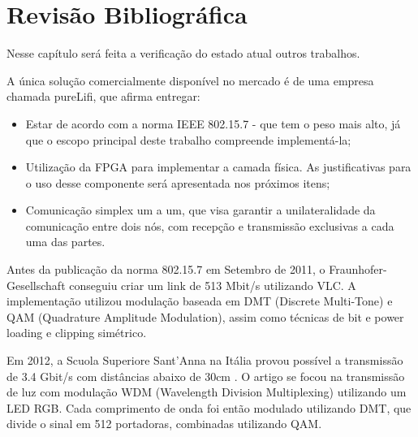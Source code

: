 	\chapter{Revisão Bibliográfica}\label{cap-revisao-bibliografica}
	
	Nesse capítulo será feita a verificação do estado atual outros trabalhos.
	
	A única solução comercialmente disponível no mercado é de uma empresa chamada pureLifi, que afirma entregar:

	\begin{itemize}
		\item Estar de acordo com a norma IEEE 802.15.7 - que tem o peso mais alto, já que o escopo principal deste trabalho compreende implementá-la;
		\item Utilização da FPGA para implementar a camada física. As justificativas para o uso desse componente será apresentada nos próximos itens;
		\item Comunicação simplex um a um, que visa garantir a unilateralidade da comunicação entre dois nós, com recepção e transmissão exclusivas a cada uma das partes.
	\end{itemize}

	Antes da publicação da norma 802.15.7 em Setembro de 2011, o Fraunhofer-Gesellschaft conseguiu criar um link de 513 Mbit/s \cite{513mb-fraunhofer} utilizando VLC. A implementação utilizou modulação baseada em DMT (Discrete Multi-Tone) e QAM (Quadrature Amplitude Modulation), assim como técnicas de bit e power loading e clipping simétrico.


	Em 2012, a Scuola Superiore Sant’Anna na Itália provou possível a transmissão de 3.4 Gbit/s com distâncias abaixo de 30cm \cite{3.4g-sant-ana}. O artigo se focou na transmissão de luz com modulação WDM (Wavelength Division Multiplexing) utilizando um LED RGB. Cada comprimento de onda foi então modulado utilizando DMT, que divide o sinal em 512 portadoras, combinadas utilizando QAM.
	
